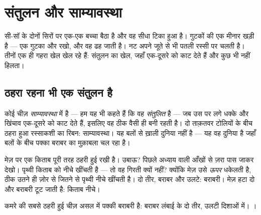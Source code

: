 \chapter{संतुलन और साम्यावस्था}\label{ch:g2:balance-equilibrium}

सी-सॉ के दोनों सिरों पर एक-एक बच्चा बैठा है और वह सीधा टिका हुआ है।
गुटकों की एक मीनार खड़ी है --- एक गुटका और रखो, और वह ढह जाती है।
नट अपने जूते से भी पतली रस्सी पर चलती है। तीनों एक ही गहरा खेल खेल
रहे हैं: संतुलन का खेल, जहाँ  एक-दूसरे को काट देते हैं और कुछ भी
नहीं हिलता।

\section{ठहरा रहना भी एक संतुलन है}

\begin{definition}[साम्यावस्था]\label{def:g2:balance-equilibrium:equilibrium}
कोई चीज़ \emph{साम्यावस्था} में है --- हम यह भी
कहते हैं कि वह \emph{संतुलित} है --- जब उस पर लगे
धक्के और खिंचाव एक-दूसरे को काट देते हैं, इसलिए वह ठीक वैसी ही बनी
रहती है। दो ताक़तवर टोलियों के बीच ठहरा हुआ रस्साकशी का रिबन:
साम्यावस्था। यह बलों से ख़ाली दुनिया नहीं है --- यह वह दुनिया है
जहाँ बलों के बीच पक्का बराबर का मुक़ाबला चल रहा है।
\end{definition}

\begin{example}[मेज़ पर रखी किताब]\label{ex:g2:balance-equilibrium:book}
मेज़ पर एक किताब पूरी तरह ठहरी हुई रखी है। उबाऊ? पिछले अध्याय वाली
आँखों से ज़रा पास जाकर देखो। पृथ्वी किताब को नीचे खींचती है ---
तो वह गिरती क्यों नहीं? क्योंकि मेज़ उसे \emph{ऊपर} धकेलती है, ठीक
उतने ही ज़ोर से जितने से पृथ्वी नीचे खींचती है। दो तीर, बराबर और उलटे:
बराबरी। मेज़ हटा दो और बराबरी टूट जाती है: किताब नीचे।
\end{example}

\begin{omfigure}

{\small कमरे की सबसे ठहरी हुई चीज़ असल में पक्की बराबरी है: बराबर
लंबाई के दो तीर, उलटी दिशाओं में। ।}
\end{omfigure}

